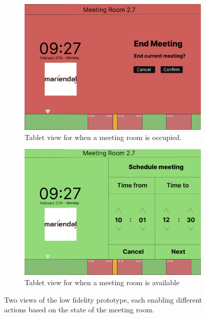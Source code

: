 \begin{figure}
    \centering
    \begin{subfigure}[b]{0.49\textwidth}
        \centering
        \includegraphics[width=\textwidth]{images/lofi_end.png}
        \caption{Tablet view for when a meeting room is occupied.}
        \label{fig:lofi_prototype:a}
    \end{subfigure}
    \begin{subfigure}[b]{0.49\textwidth}
        \centering
        \includegraphics[width=\textwidth]{images/lofi_schedule.png}
        \caption{Tablet view for when a meeting room is available}
        \label{fig:lofi_prototype:b}
    \end{subfigure}
    \caption{Two views of the low fidelity prototype, each enabling different actions based on the state of the meeting room.}
    \label{fig:lofi_prototype}
\end{figure}

